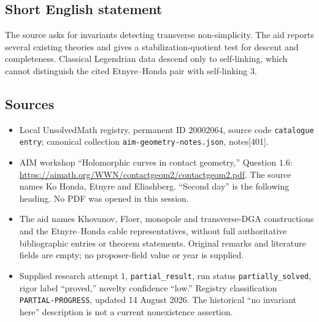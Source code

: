 \documentclass[11pt]{article}
\begin{document}
\subsection{Short English statement}
The source asks for invariants detecting transverse non-simplicity. The aid reports several existing theories and gives a stabilization-quotient test for descent and completeness. Classical Legendrian data descend only to self-linking, which cannot distinguish the cited Etnyre--Honda pair with self-linking \(3\).
\subsection{Sources}
\begin{itemize}
\item Local UnsolvedMath registry, permanent ID \(20002064\), source code \texttt{catalogue entry}; canonical collection \texttt{aim-geometry-notes.json}, notes[401].
\item AIM workshop ``Holomorphic curves in contact geometry,'' Question \(1.6\): \url{https://aimath.org/WWN/contactgeom2/contactgeom2.pdf}. The source names Ko Honda, Etnyre and Eliashberg. ``Second day'' is the following heading. No PDF was opened in this session.
\item The aid names Khovanov, Floer, monopole and transverse-DGA constructions and the Etnyre--Honda cable representatives, without full authoritative bibliographic entries or theorem statements. Original remarks and literature fields are empty; no proposer-field value or year is supplied.
\item Supplied research attempt \(1\), \texttt{partial\_result}, run status \texttt{partially\_solved}, rigor label ``proved,'' novelty confidence ``low.'' Registry classification \texttt{PARTIAL-PROGRESS}, updated 14 August 2026. The historical ``no invariant here'' description is not a current nonexistence assertion.
\end{itemize}
\end{document}
